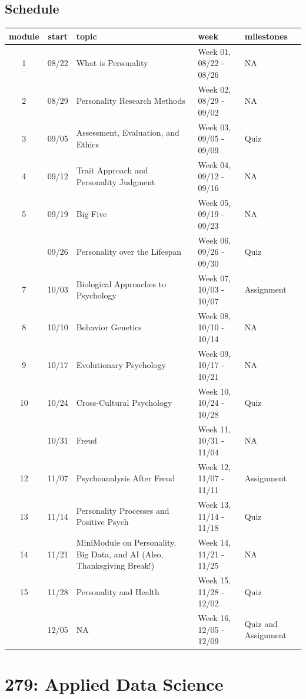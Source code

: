\documentclass[
]{book}
\begin{document}
\section*{Schedule}\label{schedule-1}


\begin{longtable}{ccp{3in}ll}
\toprule
module & start & topic & week & milestones\\
\midrule
1 & 08/22 & What is Personality & Week 01, 08/22 - 08/26 & NA\\
2 & 08/29 & Personality Research Methods & Week 02, 08/29 - 09/02 & NA\\
3 & 09/05 & Assessment, Evaluation, and Ethics & Week 03, 09/05 - 09/09 & Quiz\\
4 & 09/12 & Trait Approach and Personality Judgment & Week 04, 09/12 - 09/16 & NA\\
5 & 09/19 & Big Five & Week 05, 09/19 - 09/23 & NA\\
\addlinespace
6 & 09/26 & Personality over the Lifespan & Week 06, 09/26 - 09/30 & Quiz\\
7 & 10/03 & Biological Approaches to Psychology & Week 07, 10/03 - 10/07 & Assignment\\
8 & 10/10 & Behavior Genetics & Week 08, 10/10 - 10/14 & NA\\
9 & 10/17 & Evolutionary Psychology & Week 09, 10/17 - 10/21 & NA\\
10 & 10/24 & Cross-Cultural Psychology & Week 10, 10/24 - 10/28 & Quiz\\
\addlinespace
11 & 10/31 & Freud & Week 11, 10/31 - 11/04 & NA\\
12 & 11/07 & Psychoanalysis After Freud & Week 12, 11/07 - 11/11 & Assignment\\
13 & 11/14 & Personality Processes and Positive Psych & Week 13, 11/14 - 11/18 & Quiz\\
14 & 11/21 & MiniModule on Personality, Big Data, and AI (Also, Thanksgiving Break!) & Week 14, 11/21 - 11/25 & NA\\
15 & 11/28 & Personality and Health & Week 15, 11/28 - 12/02 & Quiz\\
\addlinespace
16 & 12/05 & NA & Week 16, 12/05 - 12/09 & Quiz and Assignment\\
\bottomrule
\end{longtable}

\chapter*{279: Applied Data Science}\label{applieddatascience}
\end{document}
